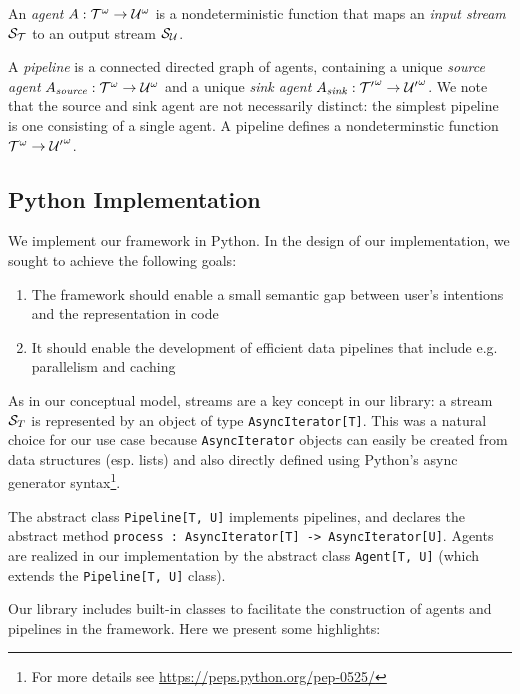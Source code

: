 An \emph{agent} $A : {\mathcal{T}}^{\omega} \rightarrow
{\mathcal{U}}^{\omega}$ is a nondeterministic function that maps an \emph{input
stream} $\mathcal{S}_{\mathcal{T}}$ to an output stream $\mathcal{S}_{\mathcal{U}}$.

A \emph{pipeline} is a connected directed graph of agents, containing a unique
\emph{source agent} $A{}_{\mathit{source}} : {\mathcal{T}}^{\omega}
\rightarrow {\mathcal{U}}^{\omega}$ and a unique \emph{sink agent}
$A_{\mathit{sink}} : {\mathcal{T}'}^{\omega} \rightarrow
{\mathcal{U}'}^{\omega}$. We note that the source and sink agent are not
necessarily distinct: the simplest pipeline is one consisting of a single agent.
A pipeline defines a nondeterminstic function ${\mathcal{T}}^{\omega}
\rightarrow {\mathcal{U}'}^{\omega}$.

\subsection{Python Implementation}

We implement our framework in Python. In the design of our implementation, we
sought to achieve the following goals:

\begin{enumerate}
  \item The framework should enable a small semantic gap \cite{semanticgap}
  between user's intentions and the representation in code
  \item It should enable the development of efficient data pipelines that include
  e.g. parallelism and caching
\end{enumerate}

As in our conceptual model, streams are a key concept in our library: a stream
$\mathcal{S}_{T}$ is represented by an object of type \texttt{AsyncIterator[T]}. This
was a natural choice for our use case because \texttt{AsyncIterator} objects can
easily be created from data structures (esp. lists) and also directly defined
using Python's async generator syntax\footnote{For more details see
\url{https://peps.python.org/pep-0525/}}.

 The abstract class
\texttt{Pipeline[T, U]} implements pipelines, and declares the abstract method
\texttt{process : AsyncIterator[T] -> AsyncIterator[U]}. Agents are realized in
our implementation by the abstract class \texttt{Agent[T, U]} (which extends the
\texttt{Pipeline[T, U]} class).

Our library includes built-in classes to facilitate the construction of agents
and pipelines in the framework. Here we present some highlights:

